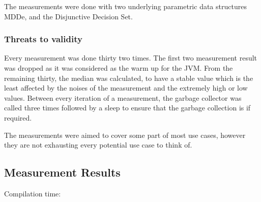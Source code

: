 	The measurements were done with two underlying parametric data structures MDDe, and the  Disjunctive Decision Set.
	
	
		\subsubsection{Threats to validity}
		Every measurement was done thirty two times. The first two measurement result was dropped as it was considered as the warm up for the JVM. From the remaining thirty, the median was calculated, to have a stable value which is the least affected by the noises of the measurement and the extremely high or low values. Between every iteration of a measurement, the garbage collector was called three times followed by a sleep to ensure that the garbage collection is if required.
		
		The measurements were aimed to cover some part of most use cases, however they are not exhausting every potential use case to think of.
		
		
	
	\subsection{Measurement Results}
		Compilation time: 
	
		
	
	
	
	